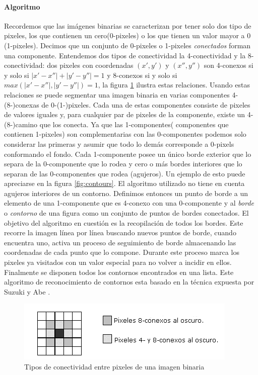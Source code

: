 	\paragraph{Algoritmo}
	Recordemos que las imágenes binarias se caracterizan por tener solo dos tipo de pixeles, los que contienen un cero(0-pixeles) o los que tienen 
	un valor mayor a 0 (1-pixeles). Decimos que un conjunto de 0-pixeles o 1-pixeles \textit{conectados} forman una componente. Entendemos dos tipos de conectividad
	la 4-conectividad y la 8-conectividad: dos pixeles con coordenadas $(x',y')$ y $(x'',y'')$ son 4-conexos si y solo si 
	$|x' - x''| + |y'-y''| = 1$ y 8-conexos si y solo si $max(|x'-x''|,|y'-y''|)=1$, la figura \ref{fig:conectividad} ilustra estas relaciones.
	Usando estas relaciones se puede segmentar una imagen binaria en varias componentes 4-(8-)conexas de 0-(1-)pixeles. Cada una de estas
	componentes consiste de pixeles de valores iguales y, para cualquier par de pixeles de la componente, existe un 4-(8-)camino que los
	conecta. Ya que las 1-componentes( componentes que contienen 1-pixeles) son complementarias con las 0-componentes podemos solo considerar las primeras y asumir que todo
	lo demás corresponde a 0-pixels conformando el fondo. Cada 1-componente  posee un único borde exterior que lo separa de la 0-componente
	que lo rodea y cero o más bordes interiores que lo separan de las 0-componentes que rodea (agujeros). Un ejemplo de esto puede apreciarse
	en la figura \ref{fig:contours}. El algoritmo utilizado no tiene en cuenta agujeros interiores de un contorno. Definimos entonces un punto de borde a un 
	elemento de una 1-componente que es 4-conexo con una 0-componente y al \textit{borde} o \textit{contorno} de una figura como un conjunto de puntos de bordes conectados. 
	El objetivo del algoritmo en cuestión es la recopilación de todos los bordes. Este recorre la imagen línea por línea buscando nuevos puntos de borde, cuando encuentra
	uno, activa un proceso de seguimiento de borde almacenando las coordenadas de cada punto que lo compone. Durante este proceso marca los pixeles ya 
	visitados con un valor especial para no volver a incidir en ellos. Finalmente se disponen todos los contornos encontrados en una lista.
	Este algoritmo de reconocimiento de contornos esta basado en la técnica expuesta por Suzuki y Abe \cite{suzuki85}.
	
	\begin{figure}[tpb]
\begin{center}
  \includegraphics[scale=0.6]{figuras/48conexos.png}
\end{center}
  \caption{\small Tipos de conectividad entre pixeles de una imagen binaria}
  \label{fig:conectividad}
\end{figure}

